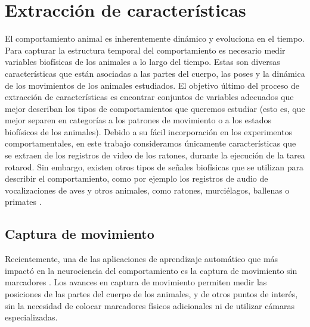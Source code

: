 \chapter{Extracción de características}\label{cha:extraccion_caracteristicas}



\clearpage

El comportamiento animal es inherentemente dinámico y evoluciona en el tiempo. Para capturar la estructura temporal del comportamiento es necesario medir variables biofísicas de los animales a lo largo del tiempo. Estas son diversas características que están asociadas a las partes del cuerpo, las poses y la dinámica de los movimientos de los animales estudiados. El objetivo último del proceso de extracción de características es encontrar conjuntos de variables adecuados que mejor describan los tipos de comportamientos que queremos estudiar (esto es, que mejor separen en categorías a los patrones de movimiento o a los estados biofísicos de los animales). Debido a su fácil incorporación en los experimentos comportamentales, en este trabajo consideramos únicamente características que se extraen de los registros de video de los ratones, durante la ejecución de la tarea rotarod. Sin embargo, existen otros tipos de señales biofísicas que se utilizan para describir el comportamiento, como por ejemplo los registros de audio de vocalizaciones de aves y otros animales, como ratones, murciélagos, ballenas o primates \cite{miranda_mouse_vocals, sainburg_birdsong_umap}.

\section{Captura de movimiento}\label{sec:captura_movimiento}

Recientemente, una de las aplicaciones de aprendizaje automático que más impactó en la neurociencia del comportamiento es la captura de movimiento sin marcadores \cite{datta_computational_neuroethology}. Los avances en captura de movimiento permiten medir las posiciones de las partes del cuerpo de los animales, y de otros puntos de interés, sin la necesidad de colocar marcadores físicos adicionales ni de utilizar cámaras especializadas.

